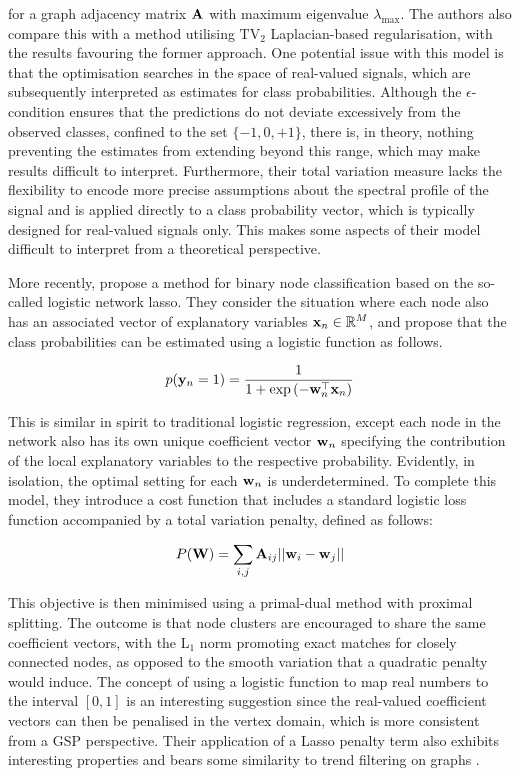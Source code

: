 for a graph adjacency matrix $\mathbf{A}$ with maximum eigenvalue $\lambda_{\text{max}}$. The authors also compare this with a method utilising $\text{TV}_2$ Laplacian-based regularisation, with the results favouring the former approach. One potential issue with this model is that the optimisation searches in the space of real-valued signals, which are subsequently interpreted as estimates for class probabilities. Although the $\epsilon$-condition ensures that the predictions do not deviate excessively from the observed classes, confined to the set $\{-1, 0, +1\}$, there is, in theory, nothing preventing the estimates from extending beyond this range, which may make results difficult to interpret. Furthermore, their total variation measure lacks the flexibility to encode more precise assumptions about the spectral profile of the signal and is applied directly to a class probability vector, which is typically designed for real-valued signals only. This makes some aspects of their model difficult to interpret from a theoretical perspective. 

More recently, \cite{Tran2020} propose a method for binary node classification based on the so-called logistic network lasso. They consider the situation where each node also has an associated vector of explanatory variables $\mathbf{x}_n \in \mathbb{R}^M$, and propose that the class probabilities can be estimated using a logistic function as follows. 

\begin{equation}
    p(\mathbf{y}_n = 1) = \frac{1}{1 + \exp \left(-\mathbf{w}_n^\top \mathbf{x}_n \right)}
\end{equation}

This is similar in spirit to traditional logistic regression, except each node in the network also has its own unique coefficient vector $\mathbf{w}_n$ specifying the contribution of the local explanatory variables to the respective probability. Evidently, in isolation, the optimal setting for each $\mathbf{w}_n$ is underdetermined. To complete this model, they introduce a cost function that includes a standard logistic loss function accompanied by a total variation penalty, defined as follows:

\begin{equation}
    P(\mathbf{W}) = \sum_{i, j} \mathbf{A}_{ij} || \mathbf{w}_i - \mathbf{w}_j ||
\end{equation}

This objective is then minimised using a primal-dual method with proximal splitting. The outcome is that node clusters are encouraged to share the same coefficient vectors, with the L$_1$ norm promoting exact matches for closely connected nodes, as opposed to the smooth variation that a quadratic penalty would induce. The concept of using a logistic function to map real numbers to the interval $[0, 1]$ is an interesting suggestion since the real-valued coefficient vectors can then be penalised in the vertex domain, which is more consistent from a GSP perspective. Their application of a Lasso penalty term also exhibits interesting properties and bears some similarity to trend filtering on graphs \citep{Wang2016}.

